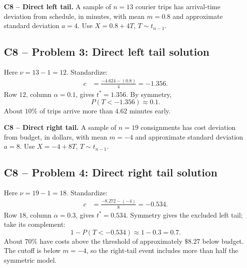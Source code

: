 {
\textbf{C8 -- Direct left tail.} A sample of $n=13$ courier trips has arrival-time deviation from schedule, in minutes, with mean $m=0.8$ and approximate standard deviation $a=4$. Use $X=0.8+4T$, $T\sim t_{n-1}$.
\label{sol:q3}
\subsection*{C8 -- Problem 3: Direct left tail solution }
Here $\nu=13-1=12$. Standardize:
\[
\begin{aligned}
c&=\frac{-4.624-(0.8)}{4}=-1.356.
\end{aligned}
\]
Row $12$, column $\alpha=0.1$, gives $t^*=1.356$. 
By symmetry,
\[
P(T<-1.356)\approx\boxed{0.1}.
\]
About $10\%$ of trips arrive more than $4.62$ minutes early.
\secInicio[][sec:q3]
}

{
\textbf{C8 -- Direct right tail.} A sample of $n=19$ consignments has cost deviation from budget, in dollars, with mean $m=-4$ and approximate standard deviation $a=8$. Use $X=-4+8T$, $T\sim t_{n-1}$.
\label{sol:q4}
\subsection*{C8 -- Problem 4: Direct right tail solution }
Here $\nu=19-1=18$. Standardize:
\[
\begin{aligned}
c&=\frac{-8.272-(-4)}{8}=-0.534.
\end{aligned}
\]
Row $18$, column $\alpha=0.3$, gives $t^*=0.534$. 
Symmetry gives the excluded left tail; take its complement:
\[
1-P(T<-0.534)\approx1-0.3=\boxed{0.7}.
\]
About $70\%$ have costs above the threshold of approximately $\$8.27$ below budget. The cutoff is below $m=-4$, so the right-tail event includes more than half the symmetric model.
\secInicio[][sec:q4]
}

